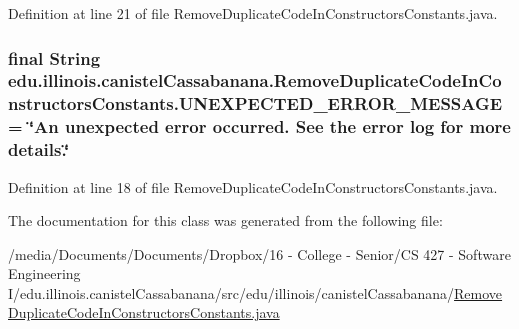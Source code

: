 Definition at line 21 of file RemoveDuplicateCodeInConstructorsConstants.java.

\hypertarget{classedu_1_1illinois_1_1canistelCassabanana_1_1RemoveDuplicateCodeInConstructorsConstants_a7a26202b57ca9d8cec6eff644aa32b0e}{
\subsubsection[{UNEXPECTED\_\-ERROR\_\-MESSAGE}]{\setlength{\rightskip}{0pt plus 5cm}final String {\bf edu.illinois.canistelCassabanana.RemoveDuplicateCodeInConstructorsConstants.UNEXPECTED\_\-ERROR\_\-MESSAGE} = \char`\"{}An unexpected error occurred. See the error log for more details.\char`\"{}}}
\label{classedu_1_1illinois_1_1canistelCassabanana_1_1RemoveDuplicateCodeInConstructorsConstants_a7a26202b57ca9d8cec6eff644aa32b0e}


Definition at line 18 of file RemoveDuplicateCodeInConstructorsConstants.java.



The documentation for this class was generated from the following file:\begin{DoxyCompactItemize}
\item 
/media/Documents/Documents/Dropbox/16 -\/ College -\/ Senior/CS 427 -\/ Software Engineering I/edu.illinois.canistelCassabanana/src/edu/illinois/canistelCassabanana/\hyperlink{RemoveDuplicateCodeInConstructorsConstants_8java}{RemoveDuplicateCodeInConstructorsConstants.java}\end{DoxyCompactItemize}
